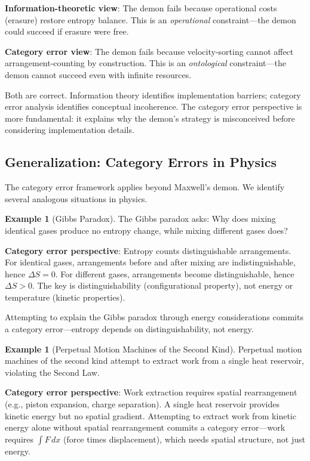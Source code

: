 \documentclass[10pt,twocolumn,letterpaper]{article}
\theoremstyle{definition}
\newtheorem{example}[theorem]{Example}
\theoremstyle{remark}
\begin{document}
\textbf{Information-theoretic view}: The demon fails because operational costs (erasure) restore entropy balance. This is an \textit{operational} constraint—the demon could succeed if erasure were free.

\textbf{Category error view}: The demon fails because velocity-sorting cannot affect arrangement-counting by construction. This is an \textit{ontological} constraint—the demon cannot succeed even with infinite resources.

Both are correct. Information theory identifies implementation barriers; category error analysis identifies conceptual incoherence. The category error perspective is more fundamental: it explains why the demon's strategy is misconceived before considering implementation details.

\subsection{Generalization: Category Errors in Physics}

The category error framework applies beyond Maxwell's demon. We identify several analogous situations in physics.

\begin{example}[Gibbs Paradox]
The Gibbs paradox asks: Why does mixing identical gases produce no entropy change, while mixing different gases does?

\textbf{Category error perspective}: Entropy counts distinguishable arrangements. For identical gases, arrangements before and after mixing are indistinguishable, hence $\Delta S = 0$. For different gases, arrangements become distinguishable, hence $\Delta S > 0$. The key is distinguishability (configurational property), not energy or temperature (kinetic properties).

Attempting to explain the Gibbs paradox through energy considerations commits a category error—entropy depends on distinguishability, not energy.
\end{example}

\begin{example}[Perpetual Motion Machines of the Second Kind]
Perpetual motion machines of the second kind attempt to extract work from a single heat reservoir, violating the Second Law.

\textbf{Category error perspective}: Work extraction requires spatial rearrangement (e.g., piston expansion, charge separation). A single heat reservoir provides kinetic energy but no spatial gradient. Attempting to extract work from kinetic energy alone without spatial rearrangement commits a category error—work requires $\int F \, dx$ (force times displacement), which needs spatial structure, not just energy.
\end{example}
\end{document}
